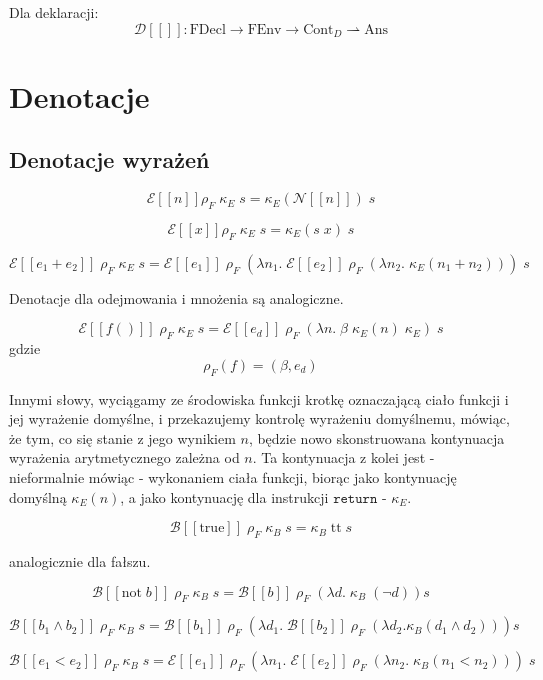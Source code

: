 \documentclass[a4paper]{article}
\begin{document}
Dla deklaracji:
$$
\mathcal{D}[\![]\!]: \text{FDecl} \longrightarrow \text{FEnv} \longrightarrow \text{Cont}_D \rightharpoonup \text{Ans}
$$


\section*{Denotacje}

\subsection*{Denotacje wyrażeń}

$$
\mathcal{E}[\![n]\!] \rho_F \; \kappa_E \; s = \kappa_E(\mathcal{N}[\![n]\!]) \; s
$$

$$
\mathcal{E}[\![ x ]\!] \rho_F \; \kappa_E \; s = \kappa_E(s \; x) \; s
$$

$$
\mathcal{E}[\![e_1 + e_2]\!] \; \rho_F \; \kappa_E \; s = \mathcal{E}[\![e_1]\!] \; \rho_F \; (\lambda n_1. \;
\mathcal{E}[\![e_2]\!] \; \rho_F \; (\lambda n_2. \;
\kappa_E (n_1+n_2))) \; s
$$

Denotacje dla odejmowania i mnożenia są analogiczne.

$$
\mathcal{E}[\![ f() ]\!] \; \rho_F \; \kappa_E \; s = \mathcal{E}[\![ e_d ]\!] \; \rho_F \; (\lambda n. \; \beta \; \kappa_E(n) \; \kappa_E)\;  s
$$
gdzie
$$
\rho_F(f) = (\beta, e_d)
$$

Innymi słowy, wyciągamy ze środowiska funkcji krotkę oznaczającą ciało funkcji i jej wyrażenie domyślne, i przekazujemy kontrolę wyrażeniu domyślnemu, mówiąc, że tym, co się stanie z jego wynikiem $n$, będzie nowo skonstruowana kontynuacja wyrażenia arytmetycznego zależna od $n$. Ta kontynuacja z kolei jest - nieformalnie mówiąc - wykonaniem ciała funkcji, biorąc jako kontynuację domyślną $\kappa_E(n)$, a jako kontynuację dla instrukcji $\texttt{return}$ - $\kappa_E$.


$$
\mathcal{B}[\![ \text{true} ]\!] \; \rho_F \; \kappa_B \; s = \kappa_B \; \text{tt} \; s
$$

analogicznie dla fałszu.

$$
\mathcal{B}[\![ \text{not} \; b]\!] \; \rho_F \; \kappa_B \; s = \mathcal{B}[\![b]\!] \; \rho_F \; (\lambda d. \; \kappa_B \; (\lnot d) ) s
$$

$$
\mathcal{B}[\![b_1 \land b_2]\!] \; \rho_F \; \kappa_B \; s = \mathcal{B}[\![b_1 ]\!] \; \rho_F \; (\lambda d_1. \; \mathcal{B}[\![b_2]\!] \; \rho_F \; (\lambda d_2. \kappa_B(d_1 \land d_2))) s
$$

$$
\mathcal{B}[\![ e_1 < e_2 ]\!] \; \rho_F \; \kappa_B \; s = \mathcal{E}[\![e_1]\!] \; \rho_F \; (\lambda n_1. \;
\mathcal{E}[\![e_2]\!] \; \rho_F \; (\lambda n_2. \;
\kappa_B (n_1 < n_2))) \; s
$$
\end{document}
